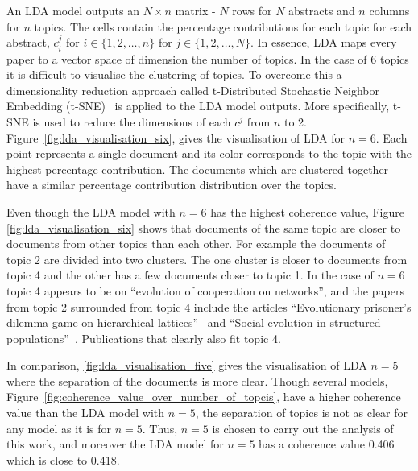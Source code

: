 \documentclass{article}
\theoremstyle{definition}
\begin{document}
An LDA model outputs an \(N \times n\) matrix - \(N\) rows for \(N\)
abstracts and \(n\) columns for \(n\) topics. The cells contain the percentage
contributions for each topic for each abstract, \(c_i^ j\) for
\(i \in \{1, 2, \dots, n\}\) for \(j \in \{1, 2, \dots, N\}\). In essence,
LDA maps every paper to a vector space of dimension the number of topics. In the case
of 6 topics it is difficult to visualise the clustering of topics. To overcome
this a dimensionality reduction approach called t-Distributed Stochastic Neighbor Embedding
(t-SNE)~\cite{Maaten2008} is applied to the LDA model outputs. More specifically,
t-SNE is used to reduce the dimensions of each \(c^j\) from \(n\) to 2.
Figure~\ref{fig:lda_visualisation_six}, gives the visualisation of LDA for \(n=6\).
Each point represents a single document and its color corresponds to the topic
with the highest percentage contribution. The documents which are clustered
together have a similar percentage contribution distribution over the topics.

Even though the LDA model with \(n=6\) has the highest coherence value, Figure
\ref{fig:lda_visualisation_six} shows that documents of the same topic are
closer to documents from other topics than each other. For example the documents
of topic 2 are divided into two clusters. The one cluster is closer to documents
from topic 4 and the other has a few documents closer to topic 1. In the case of \(n=6\)
topic 4 appears to be on ``evolution of cooperation on networks'', and the
papers from topic 2 surrounded from topic 4 include the articles
``Evolutionary prisoner's dilemma game on hierarchical lattices''~\cite{Vukov2005}
and ``Social evolution in structured populations''~\cite{Debarre2014}. Publications
that clearly also fit topic 4.

In comparison,
\ref{fig:lda_visualisation_five} gives the visualisation of LDA \(n=5\) where
the separation of the documents is more clear. Though
several models, Figure~\ref{fig:coherence_value_over_number_of_topcis}, have a
higher coherence value than the LDA model with \(n=5\), the separation
of topics is not as clear for any model as it is for \(n=5\). Thus, \(n=5\) is
chosen to carry out the analysis of this work, and moreover the LDA model for
\(n=5\) has a coherence value 0.406 which is close to 0.418.
\end{document}
